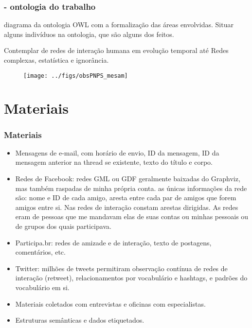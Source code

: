 \documentclass[10pt]{beamer}
\begin{document}
\begin{frame}
\frametitle{ - ontologia do trabalho}
diagrama da ontologia OWL com a formalização das
áreas envolvidas. Situar alguns indivíduos na ontologia,
que são alguns dos feitos.

Contemplar de redes de interação humana em evolução temporal até Redes complexas, estatística e ignorância.

\begin{figure}[!h]
    \texttt{[image: ../figs/obsPNPS\_mesam]}
        \label{fig:mesam}
\end{figure}


\end{frame}

\section{Materiais}
\begin{frame}
\frametitle{Materiais}
\begin{itemize}
	\item Mensagens de e-mail, com horário de envio, ID da mensagem, ID da mensagem anterior na thread se existente, texto do título e corpo. 
	\item Redes de Facebook: redes GML ou GDF geralmente baixadas do Graphviz, mas também raspadas de minha própria conta. as únicas informações da rede são: nome e ID de cada amigo, aresta entre cada par de amigos que forem amigos entre si. Nas redes de interação constam arestas dirigidas. As redes eram de pessoas que me mandavam elas de suas contas ou minhas pessoais ou de grupos dos quais participava.
	\item Participa.br: redes de amizade e de interação, texto de postagens, comentários, etc.
	\item Twitter: milhões de tweets permitiram observação contínua de redes de interação (retweet), relacionamentos por vocabulário e hashtags, e padrões do vocabulário em si.
	\item Materiais coletados com entrevistas e oficinas com especialistas.
	\item Estruturas semânticas e dados etiquetados.
\end{itemize}
\end{frame}
\end{document}
